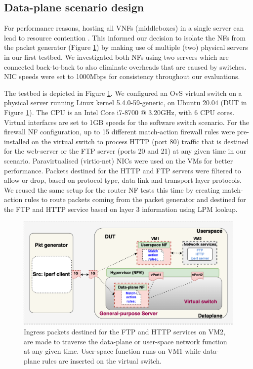 \documentclass[conference]{IEEEtran}
\begin{document}
\subsection{Data-plane scenario design}
\label{Data-plane Setup}
For performance reasons, hosting all VNFs (middleboxes) in a single server can lead to resource contention \cite{saxena2022ofp}. This informed our decision to isolate the NFs from the packet generator (Figure \ref{OvS Testbed}) by making use of multiple (two) physical servers in our first testbed. We investigated both NFs using two servers which are connected back-to-back to also eliminate overheads that are caused by switches. NIC speeds were set to 1000Mbps for consistency throughout our evaluations.
 
The testbed is depicted in Figure \ref{OvS Testbed}. We configured an OvS virtual switch on a physical server running Linux kernel 5.4.0-59-generic, on Ubuntu 20.04 (DUT in Figure \ref{OvS Testbed}). The CPU is an Intel\textregistered{} Core\texttrademark{} i7-8700 @ 3.20GHz, with 6 CPU cores. Virtual interfaces are set to 1GB speeds for the software switch scenario. For the firewall NF configuration, up to 15 different match-action firewall rules were pre-installed on the virtual switch to process HTTP (port 80) traffic that is destined for the web-server or the FTP server (ports 20 and 21) at any given time in our scenario. Paravirtualised (virtio-net) NICs were used on the VMs for better performance. Packets destined for the HTTP and FTP servers were filtered to allow or drop, based on protocol type, data link and transport layer protocols. We reused the same setup for the router NF tests this time by creating match-action rules to route packets coming from the packet generator and destined for the FTP and HTTP service based on layer 3 information using LPM lookup. 

\begin{figure}[htbp]
\centering
\includegraphics[width=0.92\columnwidth]{OVStestbed.png}
\caption{Ingress packets destined for the FTP and HTTP services on VM2, are made to traverse the data-plane or user-space network function at any given time. User-space function runs on VM1 while data-plane rules are inserted on the virtual switch.}
\label{OvS Testbed}
\end{figure}
 
\end{document}
